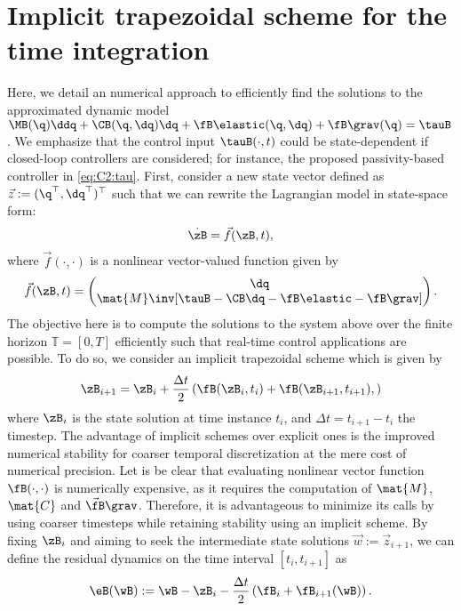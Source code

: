 \section{Implicit trapezoidal scheme for the time integration}
\label{app:C2:timeint}
\noindent Here, we detail an numerical approach to efficiently find the solutions to the approximated dynamic model $\MB(\q)\ddq + \CB(\q,\dq)\dq + \fB\elastic(\q,\dq) +  \fB\grav(\q) = \tauB$. We emphasize that the control input $\tauB(\cdot,t)$ could be state-dependent if closed-loop controllers are considered; for instance, the proposed passivity-based controller in \eqref{eq:C2:tau}. First, consider a new state vector defined as $\vec{z} := ( \q^\top,\dq^\top )^\top$ such that we can rewrite the Lagrangian model in state-space form:
%
\begin{equation}
\dot{\zB} = \vec{f}(\zB,t),
\end{equation}
%
where $\vec{f}(\cdot,\cdot)$ is a nonlinear vector-valued function given by
%
\begin{equation}
\vec{f}(\zB,t) = \begin{pmatrix} \dq \\ \mat{M}\inv [\tauB - \CB\dq - \fB\elastic- \fB\grav] \end{pmatrix}.
\end{equation}
%
The objective here is to compute the solutions to the system above over the finite horizon $\mathbb{T} = [0,T]$ efficiently such that real-time control applications are possible. To do so, we consider an implicit trapezoidal scheme which is given by
%
\begin{equation}
\zB_{i+1} = \zB_{i} + \frac{\Delta t}{2} \left( \fB(\zB_{i},t_{i}) + \fB(\zB_{i+1},t_{i+1}),  \right)
\end{equation}
%
where $\zB_{i}$ is the state solution at time instance $t_{i}$, and $\Delta t = t_{i+1} - t_{i}$ the timestep. The advantage of implicit schemes over explicit ones is the improved numerical stability for coarser temporal discretization at the mere cost of numerical precision. Let is be clear that evaluating nonlinear vector function $\fB(\cdot,\cdot)$ is numerically expensive, as it requires the computation of $\mat{M}$, $\mat{C}$ and $\vec{\fB}\grav$. Therefore, it is advantageous to minimize its calls by using coarser timesteps while retaining stability using an implicit scheme. By fixing $\zB_{i}$ and aiming to seek the intermediate state solutions $\vec{w}:=\vec{z}_{i+1}$, we can define the residual dynamics on the time interval $[t_{i}, t_{i+1}]$ as
%
\begin{align}
\eB(\wB) :=  \wB - \zB_{i} - \frac{\Delta t}{2} \left( \fB_i + \fB_{i+1}(\wB)  \right).
\end{align}
